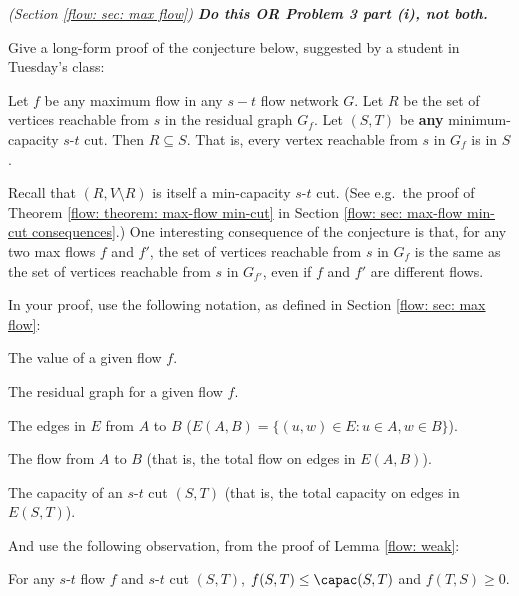 \documentclass[11pt]{article}
\begin{document}

\newpage

\problem[3 part (ii)] \emph{(Section \ref{flow: sec: max flow})}
\textbf{\em Do this OR Problem 3 part (i), not both.}

Give a long-form proof of the conjecture below,
suggested by a student in Tuesday's class:

\begin{conjecture}\label{conjecture: problem 3 ii}
  Let $f$ be any maximum flow in any $s-t$ flow network $G$.
  Let $R$ be the set of vertices reachable from $s$ in the residual graph $G_f$.
  Let $(S, T)$ be \textbf{any} minimum-capacity $s$-$t$ cut. 
  Then $R\subseteq S$. 
  That is, every vertex reachable from $s$ in $G_f$ is in $S$.
\end{conjecture}

Recall that $(R, V\setminus R)$ is itself a min-capacity $s$-$t$ cut.
(See e.g.~the proof of Theorem \ref{flow: theorem: max-flow min-cut} in Section \ref{flow: sec: max-flow min-cut consequences}.)
One interesting consequence of the conjecture is that,
for any two max flows $f$ and $f'$,
the set of vertices reachable from $s$ in $G_f$
is the same as the set of vertices reachable from $s$ in $G_{f'}$,
even if $f$ and $f'$ are different flows.

In your proof, use the following notation, as defined in Section \ref{flow: sec: max flow}:
\begin{mylist}
\item[$|f|$:] The value of a given flow $f$.
\item[$G_f$:] The residual graph for a given flow $f$.
\item[$E(A, B)$:] The edges in $E$ from $A$ to $B$ ($E(A,B) = \{(u,w) \in E: u\in A, w\in B\}$).
\item[$f(A, B)$:] The flow from $A$ to $B$ (that is, the total flow on edges in $E(A, B)$).
\item[$\capac(S, T)$:] The capacity of an $s$-$t$ cut $(S, T)$ (that is, the total capacity on edges in $E(S, T)$).
\end{mylist}

And use the following observation, from the proof of Lemma \ref{flow: weak}:
\begin{observation}\label{obs: lemma 2}
  For any $s$-$t$ flow $f$ and $s$-$t$ cut $(S, T)$,
  $f(S, T) \le \capac(S, T)$ and $f(T, S) \ge 0$.  
\end{observation}

\hrulefill

\vfill 

{}

\vfill 

\newpage

{}
\end{document}
